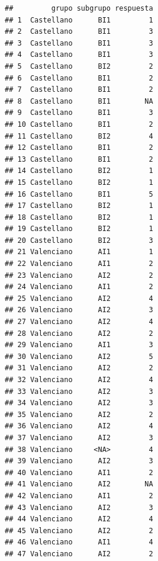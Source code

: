 \documentclass[
]{article}
\begin{document}
\begin{verbatim}
##         grupo subgrupo respuesta
## 1  Castellano      BI1         1
## 2  Castellano      BI1         3
## 3  Castellano      BI1         3
## 4  Castellano      BI1         3
## 5  Castellano      BI2         2
## 6  Castellano      BI1         2
## 7  Castellano      BI1         2
## 8  Castellano      BI1        NA
## 9  Castellano      BI1         3
## 10 Castellano      BI1         2
## 11 Castellano      BI2         4
## 12 Castellano      BI1         2
## 13 Castellano      BI1         2
## 14 Castellano      BI2         1
## 15 Castellano      BI2         1
## 16 Castellano      BI1         5
## 17 Castellano      BI2         1
## 18 Castellano      BI2         1
## 19 Castellano      BI2         1
## 20 Castellano      BI2         3
## 21 Valenciano      AI1         1
## 22 Valenciano      AI1         2
## 23 Valenciano      AI2         2
## 24 Valenciano      AI1         2
## 25 Valenciano      AI2         4
## 26 Valenciano      AI2         3
## 27 Valenciano      AI2         4
## 28 Valenciano      AI2         2
## 29 Valenciano      AI1         3
## 30 Valenciano      AI2         5
## 31 Valenciano      AI2         2
## 32 Valenciano      AI2         4
## 33 Valenciano      AI2         3
## 34 Valenciano      AI2         3
## 35 Valenciano      AI2         2
## 36 Valenciano      AI2         4
## 37 Valenciano      AI2         3
## 38 Valenciano     <NA>         4
## 39 Valenciano      AI2         3
## 40 Valenciano      AI1         2
## 41 Valenciano      AI2        NA
## 42 Valenciano      AI1         2
## 43 Valenciano      AI2         3
## 44 Valenciano      AI2         4
## 45 Valenciano      AI2         2
## 46 Valenciano      AI1         4
## 47 Valenciano      AI2         2
\end{verbatim}
\end{document}
